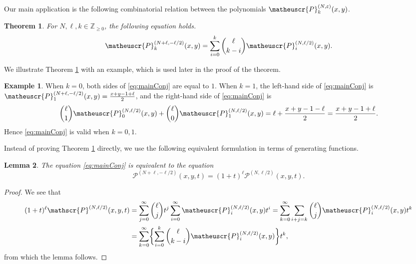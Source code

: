 \documentclass[11pt]{article}
\numberwithin{equation}{section}
\newcommand{\Z}{\mathbb{Z}} %
\newcommand{\e}{\varepsilon}
\newcommand{\ncp}[2]{\matheuscr{P}^{(#1)}_{#2}} %
\newcommand{\Gncp}[1]{\mathscr{P}^{(#1)}} %
\theoremstyle{plain}
\newtheorem{thm}{Theorem}[section]
\newtheorem{lem}[thm]{Lemma}
\theoremstyle{definition}
\newtheorem{ex}{Example}[section]
\theoremstyle{remark}
\begin{document}
Our main application is the following combinatorial relation between the polynomials \(\ncp{N,\e}{k}(x,y)\).

\begin{thm}
  \label{thm:mainConj}
  For $N, \ell, k \in \Z_{\geq0}$, the following equation holds.
  \begin{equation}\label{eq:mainConj}
    \ncp{N+\ell,-\ell/2}k(x,y)=\sum_{i=0}^k \binom{\ell}{k-i} \ncp{N,\ell/2}i(x,y).
  \end{equation}
\end{thm}


We illustrate Theorem \ref{thm:mainConj} with an example, which is used later in the proof of the theorem.

\begin{ex}\label{ex:k=0,1}
  When $k=0$, both sides of \eqref{eq:mainConj} are equal to $1$.
  When $k=1$, the left-hand side of \eqref{eq:mainConj} is $\ncp{N+\ell,-\ell/2}1(x,y)=\frac{x+y-1+\ell}2$,
  and the right-hand side of \eqref{eq:mainConj} is
\begin{equation*}
  \binom \ell 1\ncp{N,\ell/2}0(x,y)+\binom \ell 0\ncp{N,\ell/2}1(x,y) =\ell+\frac{x+y-1-\ell}2 =\frac{x+y-1+\ell}2.
\end{equation*}
Hence \eqref{eq:mainConj} is valid when $k=0,1$.
\end{ex}

Instead of proving Theorem \ref{thm:mainConj} directly, we use
the following equivalent formulation in terms of generating functions.

\begin{lem}\label{lem:reduction to GF}
  The equation \eqref{eq:mainConj} is equivalent to the equation
  \begin{equation}
    \Gncp{N+\ell,-\ell/2}(x,y,t)=(1+t)^\ell\Gncp{N,\ell/2}(x,y,t). \label{eq:reduction to GF}
  \end{equation}
\end{lem}

\begin{proof}
  We see that
  \begin{align*}
    (1+t)^{\ell}  \Gncp{N,\ell/2}(x,y,t) &=\sum_{j=0}^\infty\binom{\ell}jt^j\sum_{i=0}^\infty \ncp{N,\ell/2}i(x,y)t^i =\sum_{k=0}^\infty\sum_{i+j=k} \binom{\ell}j\ncp{N,\ell/2}i(x,y)t^k \\
      &=\sum_{k=0}^\infty \biggl\{\sum_{i=0}^k \binom{\ell}{k-i}\ncp{N,\ell/2}i(x,y)\biggr\}t^k,
  \end{align*}
  from which the lemma follows. 
\end{proof}
\end{document}
